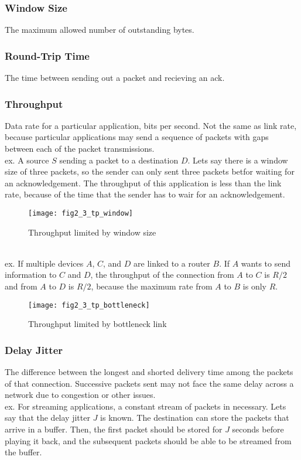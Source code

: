\subsubsection*{Window Size}
The maximum allowed number of outstanding bytes.
\subsubsection*{Round-Trip Time}
The time between sending out a packet and recieving an ack.
\subsubsection*{Throughput}
Data rate for a particular application, bits per second. Not the same as link rate, because particular applications may send a sequence of packets with gaps between each of the packet transmissions. \\
ex. A source $S$ sending a packet to a destination $D$. Lets say there is a window size of three packets, so the sender can only sent three packets betfor waiting for an acknowledgement. The throughput of this application is less than the link rate, because of the time that the sender has to wair for an acknowledgement. 
\begin{figure}[!htbp]
    \centering
    \texttt{[image: fig2\_3\_tp\_window]}
    \caption{Throughput limited by window size}
    \label{fig:tp_window}
\end{figure}
\\ ex. If multiple devices $A$, $C$, and $D$ are linked to a router $B$. If $A$ wants to send information to $C$ and $D$, the throughput of the connection from $A$ to $C$ is $R/2$ and from $A$ to $D$ is $R/2$, because the maximum rate from $A$ to $B$ is only $R$. 
\begin{figure}[!htbp]
    \centering
    \texttt{[image: fig2\_3\_tp\_bottleneck]}
    \caption{Throughput limited by bottleneck link}
    \label{fig:tp_bottleneck}
\end{figure}

\subsubsection*{Delay Jitter}
The difference between the longest and shorted delivery time among the packets of that connection. Successive packets sent may not face the same delay across a network due to congestion or other issues. \\
ex. For streaming applications, a constant stream of packets in necessary. Lets say that the delay jitter $J$ is known. The destination can store the packets that arrive in a buffer. Then, the first packet should be stored for $J$ seconds before playing it back, and the subsequent packets should be able to be streamed from the buffer.

